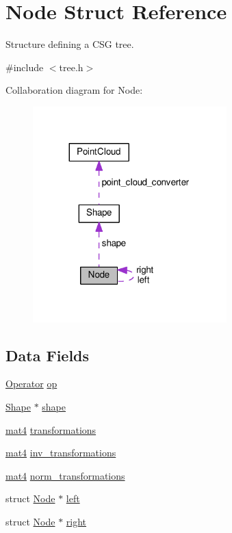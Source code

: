 \hypertarget{struct_node}{}\section{Node Struct Reference}
\label{struct_node}


Structure defining a C\+SG tree.  




{\ttfamily \#include $<$tree.\+h$>$}



Collaboration diagram for Node\+:
\nopagebreak
\begin{figure}[H]
\begin{center}
\leavevmode
\includegraphics[width=212pt]{struct_node__coll__graph}
\end{center}
\end{figure}
\subsection*{Data Fields}
\begin{DoxyCompactItemize}
\item 
\hyperlink{tree_8h_a7215803e478cdd4bdf4f1b8087cae87b}{Operator} \hyperlink{struct_node_a2a8ef6b2c643a5bc2991ec125cbdb700}{op}
\item 
\hyperlink{struct_shape}{Shape} $\ast$ \hyperlink{struct_node_a3f409da58d3391e8f33c69cce5e4044f}{shape}
\item 
\hyperlink{types_8h_af8defaae7643cbe46b09ad8dea2eca9b}{mat4} \hyperlink{struct_node_aaeb58d722bd66bac7f6f6b4d715ba4c2}{transformations}
\item 
\hyperlink{types_8h_af8defaae7643cbe46b09ad8dea2eca9b}{mat4} \hyperlink{struct_node_a4b726ee7ba7e35b04356dae649a0f39e}{inv\+\_\+transformations}
\item 
\hyperlink{types_8h_af8defaae7643cbe46b09ad8dea2eca9b}{mat4} \hyperlink{struct_node_a902250dd3f3a7dc23af98f9a7df93317}{norm\+\_\+transformations}
\item 
struct \hyperlink{struct_node}{Node} $\ast$ \hyperlink{struct_node_a25eed0b3ce3478a3edb4a00c81dedd5e}{left}
\item 
struct \hyperlink{struct_node}{Node} $\ast$ \hyperlink{struct_node_a760682e46f54442d313a05d18095b52f}{right}
\end{DoxyCompactItemize}


